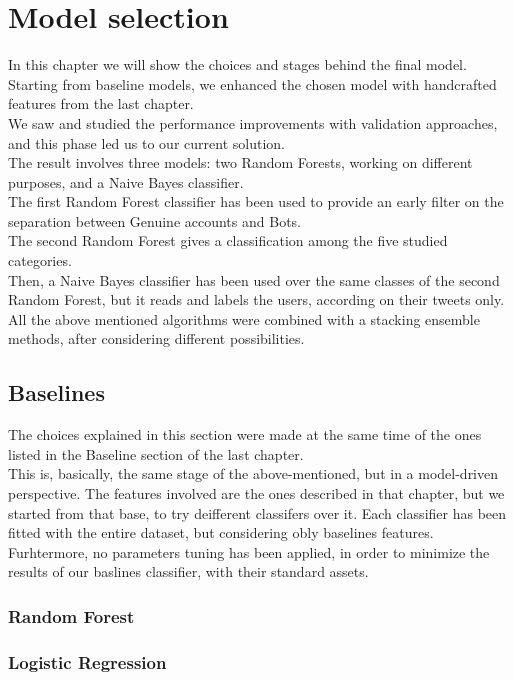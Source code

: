 \chapter{Model selection}
\label{capitolo5}
\thispagestyle{empty}

In this chapter we will show the choices and stages behind the final model.
Starting from baseline models, we enhanced the chosen model with handcrafted features from the last chapter.\\
We saw and studied the performance improvements with validation approaches, and this phase led us to our current solution.\\
The result involves three models: two Random Forests, working on different purposes, and a Naive Bayes classifier.\\
The first Random Forest classifier has been used to provide an early filter on the separation between Genuine accounts and Bots.\\
The second Random Forest gives a classification among the five studied categories.\\
Then, a Naive Bayes classifier has been used over the same classes of the second Random Forest, but it reads and labels the users, according on their tweets only.\\
All the above mentioned algorithms were combined with a stacking ensemble methods, after considering different possibilities.

\section{Baselines}
The choices explained in this section were made at the same time of the ones listed in the Baseline section of the last chapter.\\
This is, basically, the same stage of the above-mentioned, but in a model-driven perspective.
The features involved are the ones described in that chapter, but we started from that base, to try deifferent classifers over it.
Each classifier has been fitted with the entire dataset, but considering obly baselines features.
Furhtermore, no parameters tuning has been applied, in order to minimize the results of our baslines classifier, with their standard assets.
\subsection{Random Forest}
\subsection{Logistic Regression}
